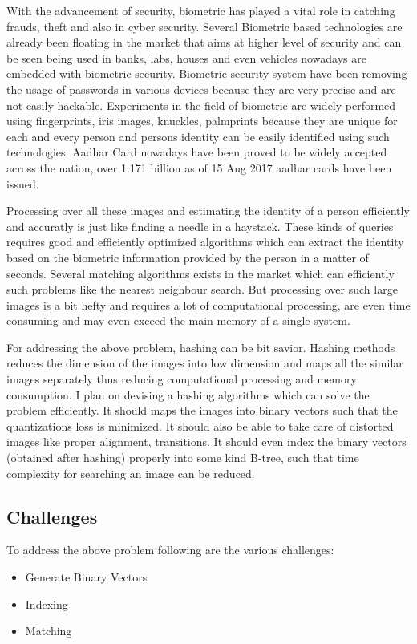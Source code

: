 \documentclass[12pt, a4paper,twoside]{article}
\begin{document}
\label{sec:Problem Statement}
	With the advancement of security, biometric has played a vital role in catching frauds, theft and also in cyber security.
	Several Biometric based technologies are already been floating in the market that aims at higher level of security and can be seen being used in banks,
	labs, houses and even vehicles nowadays are embedded with biometric security. Biometric security system have been removing the usage of passwords in various devices because they are very precise and are not easily hackable. Experiments in the field of biometric are widely performed using fingerprints, iris images, knuckles, palmprints because they are unique for each and every person and persons identity can be easily identified using such technologies.
	Aadhar Card nowadays have been proved to be widely accepted across the nation, over 1.171 billion as of 15 Aug 2017 aadhar cards have been issued.

	Processing over all these images and estimating the identity of a person efficiently and accuratly is just like finding a needle in a haystack.
	These kinds of queries requires good and efficiently optimized algorithms which can extract the identity based on the biometric information provided by the person in a matter of seconds. Several matching algorithms exists in the market which can efficiently such problems like the nearest neighbour search.
	But processing over such large images is a bit hefty and requires a lot of computational processing, are even time consuming and may even exceed the main memory of a single system.

	For addressing the above problem, hashing can be bit savior. Hashing methods reduces the dimension of the images into low dimension and maps all the similar
	images separately thus reducing computational processing and memory consumption. I plan on devising a hashing algorithms which can solve the problem efficiently. It should maps the images into binary vectors such that the quantizations loss is minimized. It should also be able to take care of distorted images like proper alignment, transitions. It should even index the binary vectors (obtained after hashing) properly into some kind B-tree, such that time complexity for searching an image can be reduced. 

\subsection{Challenges}
\label{sec:challenges}
	To address the above problem following are the various challenges:

\begin{itemize}
	\item Generate Binary Vectors
	\item Indexing
	\item Matching

\end{itemize}
\end{document}
